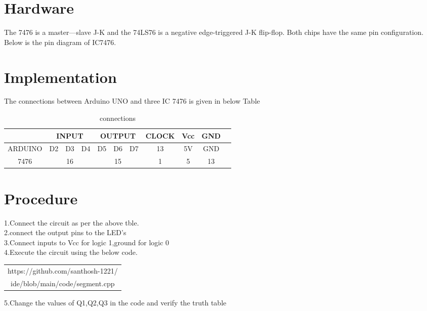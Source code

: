 \documentclass[journal,12pt]{article}
\begin{document}
\section{Hardware}
        The 7476 is a master—slave J-K and the 74LS76 is a negative edge-triggered J-K flip-flop. Both chips have the same pin configuration. Below is the pin diagram of IC7476. \\
\begin{figure}[ih]
	\centering
	
	\caption{}
	\label{pindiagram.}
\end{figure}
\section{Implementation}
The connections between Arduino UNO and three IC 7476 is given in below Table \\
\begin{table}[h]
	\begin{center}
	\begin{tabular}{|c|c|c|c|c|c|c|c|c|c|c|}
		\hline & \multicolumn{3}{|c|}{INPUT} & \multicolumn{3}{|c|}{OUTPUT} & CLOCK & Vcc & GND \\
		\hline ARDUINO & D2 & D3 & D4 & D5 & D6 & D7 & 13 & 5V & GND \\
		\hline 7476 & \multicolumn{3}{|c|}{16} & \multicolumn{3}{|c|}{15} & 1 & 5 & 13 \\
		\hline
	\end{tabular}
	\end{center}
	\caption{connections}
	\label{table:1}
\end{table}
\section{Procedure}
\begin{raggedright}
    1.Connect the circuit as per the above tble.\\
    2.connect the output pins to the LED's \\
    3.Connect inputs to Vcc for logic 1,ground for logic 0 \\
    4.Execute the circuit using the below code.\\
\begin{table}[h]
\centering
	\begin{tabular}{|c|}
	\hline
	https://github.com/santhosh-1221/ \\
		ide/blob/main/code/segment.cpp \\
	\hline
\end{tabular}
\end{table}
     5.Change the values of Q1,Q2,Q3 in the code and verify the truth table \\
\end{raggedright}

\end{document}
